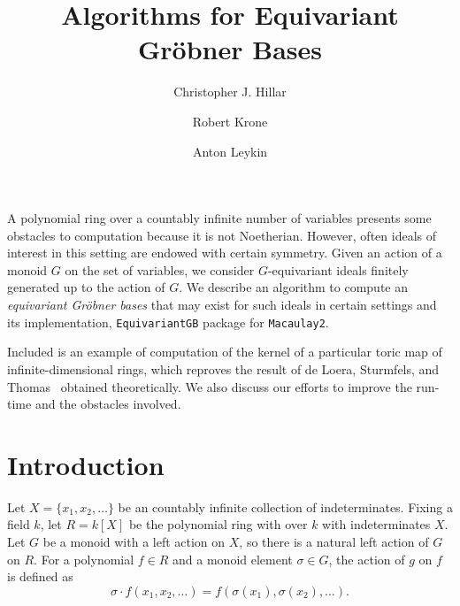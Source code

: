 \documentclass[10pt]{amsart}
\theoremstyle{definition}
\theoremstyle{remark}
\numberwithin{equation}{section}
\newcommand{\<}{\langle}
\renewcommand{\>}{\rangle}
\begin{document}
 \title[Algorithms for Equivariant Gr\"obner Bases]
{Algorithms for Equivariant Gr\"obner Bases}

\author{Christopher J. Hillar}
\address{Redwood Center for Theoretical Neuroscience, University of California, Berkeley}

\author{Robert Krone}
\address{Georgia Institute of Technology, Atlanta, GA}

\author{Anton Leykin}
\address{Georgia Institute of Technology, Atlanta, GA}


%




\maketitle

 A polynomial ring over a countably infinite number of variables presents some obstacles to computation because it is not Noetherian.  However, often ideals of interest in this setting are endowed with certain symmetry.  Given an action of a monoid $G$ on the set of variables, we consider $G$-equivariant ideals finitely generated up to the action of $G$. We describe an algorithm to compute an {\em equivariant Gr\"obner bases} that may exist for such ideals in certain settings and its implementation, {\tt EquivariantGB} package for {\tt Macaulay2}.
 
 Included is an example of computation of the kernel of a particular toric map of infinite-dimensional rings, which reproves the result of de Loera, Sturmfels, and Thomas~\cite{deLoera-Sturmfels-Thomas} obtained theoretically. We also discuss our efforts to improve the run-time and the obstacles involved.

\section{Introduction}
Let $X = \{x_1,x_2,\ldots\}$ be an countably infinite collection of indeterminates.  Fixing a field $k$, let $R = k[X]$ be the polynomial ring with over $k$ with indeterminates $X$.  Let $G$ be a monoid with a left action on $X$, so there is a natural left action of $G$ on $R$.  For a polynomial $f \in R$ and a monoid element $\sigma \in G$, the action of $g$ on $f$ is defined as
 \[ \sigma\cdot f(x_1,x_2,\ldots) = f(\sigma(x_1),\sigma(x_2),\ldots). \]
\end{document}
